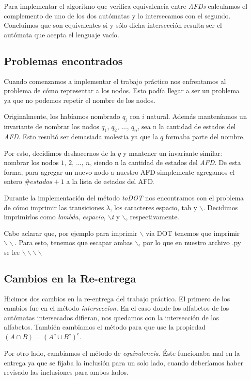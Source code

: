Para implementar el algoritmo que verifica equivalencia entre \emph{AFDs} calculamos el complemento de uno de los dos autómatas y lo intersecamos con el segundo. Concluimos que son equivalentes si y sólo dicha intersección resulta ser el autómata que acepta el lenguaje vacío.

\subsection{Problemas encontrados}

Cuando comenzamos a implementar el trabajo práctico nos enfrentamos al problema de cómo representar a los nodos. Esto podía llegar a ser un problema ya que no podemos repetir el nombre de los nodos.

Originalmente, los habíamos nombrado \emph{$q_i$} con $i$ natural. Además manteníamos un invariante de nombrar los nodos $q_1$, $q_2$, $\hdots$, $q_n$, sea n la cantidad de estados del \emph{AFD}. Esto resultó ser demasiada molestia ya que la $q$ formaba parte del nombre.

Por esto, decidimos deshacernos de la $q$ y mantener un invariante similar: nombrar los nodos $1$, $2$, $\hdots$, $n$, siendo n la cantidad de estados del \emph{AFD}. De esta forma, para agregar un nuevo nodo a nuestro AFD simplemente agregamos el entero $\#estados + 1$ a la lista de estados del AFD.


Durante la implementación del método \emph{toDOT} nos encontramos con el problema de cómo imprimir las transiciones $\lambda$, los caracteres espacio, tab y $\backslash$. Decidimos imprimirlos como \emph{lambda}, \emph{espacio},  \emph{$\backslash$t} y $\backslash$, respectivamente.

Cabe aclarar que, por ejemplo para imprimir $\backslash$ vía DOT tenemos que imprimir $\backslash\backslash$. Para esto, tenemos que escapar ambas $\backslash$, por lo que en nuestro archivo .py se lee $\backslash\backslash\backslash\backslash$

\subsection{Cambios en la Re-entrega}
Hicimos dos cambios en la re-entrega del trabajo práctico. El primero de los cambios fue en el método \emph{interseccion}. En el caso donde los alfabetos de los autómatas intersecados difieran, nos quedamos con la intersección de los alfabetos. También cambiamos el método para que use la propiedad $(A \cap B) = (A^c \cup B^c)^c$.

Por otro lado, cambiamos el método de \emph{equivalencia}. Éste funcionaba mal en la entrega ya que se fijaba la inclusión para un solo lado, cuando deberíamos haber revisado las inclusiones para ambos lados.
